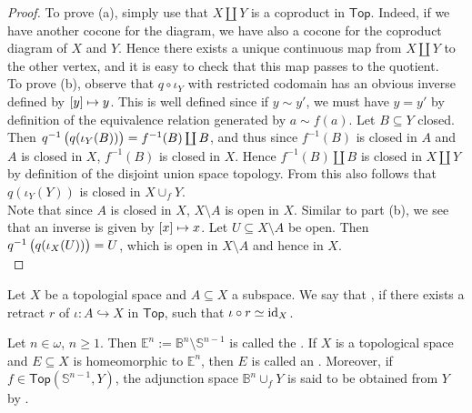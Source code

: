 \begin{proof}
	To prove (a), simply use that $X \coprod Y$ is a coproduct in $\mathsf{Top}$. Indeed, if we have another cocone for the diagram, we have also a cocone for the coproduct diagram of $X$ and $Y$. Hence there exists a unique continuous map from $X \coprod Y$ to the other vertex, and it is easy to check that this map passes to the quotient.\\
	To prove (b), observe that $q \circ \iota_Y$ with restricted codomain has an obvious inverse defined by $\sbr[0]{y} \mapsto y$. This is well defined since if $y {\sim}y'$, we must have $y = y'$ by definition of the equivalence relation generated by $a{\sim}f(a)$. Let $B \subseteq Y$ closed. Then $q^{-1}\del[1]{q(\iota_Y(B))} = f^{-1}(B) \coprod B$, and thus since $f^{-1}(B)$ is closed in $A$ and $A$ is closed in $X$, $f^{-1}(B)$ is closed in $X$. Hence $f^{-1}(B) \coprod B$ is closed in $X \coprod Y$ by definition of the disjoint union space topology. From this also follows that $q(\iota_Y(Y))$ is closed in $X \cup_f Y$.\\
	Note that since $A$ is closed in $X$, $X \setminus A$ is open in $X$. Similar to part (b), we see that an inverse is given by $\sbr{x} \mapsto x$. Let $U \subseteq X \setminus A$ be open. Then $q^{-1}\del[1]{q(\iota_X(U))} = U$, which is open in $X \setminus A$ and hence in $X$.\\
	
\end{proof}

\begin{definition}
	Let $X$ be a topologial space and $A \subseteq X$ a subspace. We say that , if there exists a retract $r$ of $\iota : A \hookrightarrow X$ in $\mathsf{Top}$, such that $\iota \circ r \simeq \operatorname{id}_X$.
\end{definition}

\begin{definition}[Cells]
	Let $n \in \omega$, $n \geq 1$. Then $\mathbb{E}^n := \mathbb{B}^n \setminus \mathbb{S}^{n-1}$ is called the . If $X$ is a topological space and $E \subseteq X$ is homeomorphic to $\mathbb{E}^n$, then $E$ is called an . Moreover, if $f \in \mathsf{Top}(\mathbb{S}^{n-1},Y)$, the adjunction space $\mathbb{B}^n \cup_f Y$ is said to be obtained from $Y$ by . 
\end{definition}

